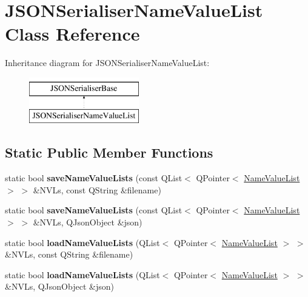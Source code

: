 \hypertarget{class_j_s_o_n_serialiser_name_value_list}{}\section{J\+S\+O\+N\+Serialiser\+Name\+Value\+List Class Reference}
\label{class_j_s_o_n_serialiser_name_value_list}
Inheritance diagram for J\+S\+O\+N\+Serialiser\+Name\+Value\+List\+:\begin{figure}[H]
\begin{center}
\leavevmode
\includegraphics[height=2.000000cm]{class_j_s_o_n_serialiser_name_value_list}
\end{center}
\end{figure}
\subsection*{Static Public Member Functions}
\begin{DoxyCompactItemize}
\item 
\mbox{\label{class_j_s_o_n_serialiser_name_value_list_a4233065413e9c789fe43a6f4e289a060}} 
static bool {\bfseries save\+Name\+Value\+Lists} (const Q\+List$<$ Q\+Pointer$<$ \hyperlink{class_name_value_list}{Name\+Value\+List} $>$ $>$ \&N\+V\+Ls, const Q\+String \&filename)
\item 
\mbox{\label{class_j_s_o_n_serialiser_name_value_list_a9c2fd0e91ba76e1601213c1f816cb28c}} 
static bool {\bfseries save\+Name\+Value\+Lists} (const Q\+List$<$ Q\+Pointer$<$ \hyperlink{class_name_value_list}{Name\+Value\+List} $>$ $>$ \&N\+V\+Ls, Q\+Json\+Object \&json)
\item 
\mbox{\label{class_j_s_o_n_serialiser_name_value_list_aaff4b58b94a7915a17836850e282c79d}} 
static bool {\bfseries load\+Name\+Value\+Lists} (Q\+List$<$ Q\+Pointer$<$ \hyperlink{class_name_value_list}{Name\+Value\+List} $>$ $>$ \&N\+V\+Ls, const Q\+String \&filename)
\item 
\mbox{\label{class_j_s_o_n_serialiser_name_value_list_a2554b2bcdaaa7ea0b1bbf8288adc60ed}} 
static bool {\bfseries load\+Name\+Value\+Lists} (Q\+List$<$ Q\+Pointer$<$ \hyperlink{class_name_value_list}{Name\+Value\+List} $>$ $>$ \&N\+V\+Ls, Q\+Json\+Object \&json)
\end{DoxyCompactItemize}


